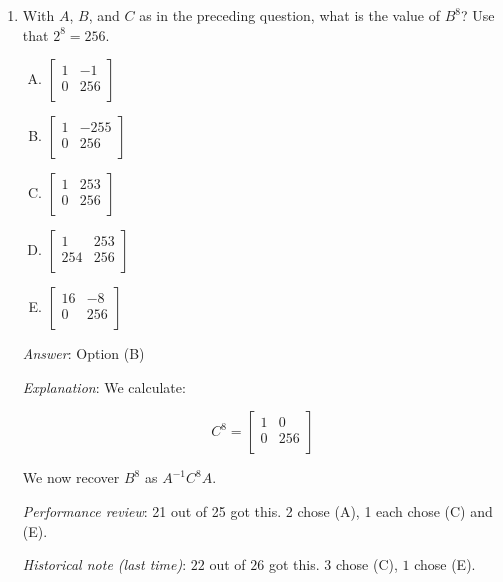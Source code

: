 \documentclass[10pt]{amsart}
\begin{document}
\begin{enumerate}
  {\em Performance review}: 23 out of 25 got this. 2 chose (B).

  {\em Historical note (last time)}: $23$ out of $26$ got this. $2$ chose (B),
  $1$ chose (C).

\item With $A$, $B$, and $C$ as in the preceding question, what is the
  value of $B^8$? Use that $2^8 = 256$.

  \begin{enumerate}[(A)]
  \item $\left[ \begin{matrix} 1 & -1 \\ 0 & 256 \\\end{matrix}\right]$
  \item $\left[ \begin{matrix} 1 & -255 \\ 0 & 256 \\\end{matrix}\right]$
  \item $\left[ \begin{matrix} 1 & 253 \\ 0 & 256 \\\end{matrix}\right]$
  \item $\left[ \begin{matrix} 1 & 253 \\ 254 & 256 \\\end{matrix}\right]$
  \item $\left[ \begin{matrix} 16 & -8 \\ 0 & 256 \\\end{matrix}\right]$
  \end{enumerate}

  {\em Answer}: Option (B)

  {\em Explanation}: We calculate:

  $$C^8 = \left[\begin{matrix} 1 & 0 \\ 0 & 256 \\\end{matrix}\right]$$

  We now recover $B^8$ as $A^{-1}C^8A$.

  {\em Performance review}: 21 out of 25 got this. 2 chose (A), 1 each
  chose (C) and (E).

  {\em Historical note (last time)}: $22$ out of $26$ got this. $3$ chose (C),
  $1$ chose (E).


\end{enumerate}
\end{document}
